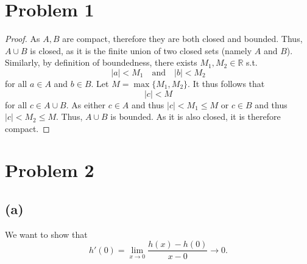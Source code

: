 \documentclass[10pt]{article}
\begin{document}
\section*{Problem 1}

\begin{proof}
    As $A,B$ are compact, therefore they are both closed and bounded. Thus, $A\cup B$ is closed, as it is the finite union of two closed sets (namely $A$ and $B$). Similarly, by definition of boundedness, there exists $M_1,M_2\in\mathbb{R}$ s.t.
    \[|a|<M_1 \quad\text{and}\quad|b|<M_2 \] 
    for all $a\in A$ and $b\in B.$ Let $M=\max\{M_1,M_2\}.$ It thus follows that
    \[|c|<M\]
    for all $c\in A\cup B.$ As either $c\in A$ and thus $|c|<M_1\le M$ or $c\in B$ and thus $|c|<M_2\le M.$  Thus, $A\cup B$ is bounded.
    As it is also closed, it is therefore compact.
\end{proof}

\section*{Problem 2}

\subsection*{(a)}

We want to show that
\begin{equation} \label{eq:funcl}
    h'(0)=\lim_{x\to 0} \frac{h(x)-h(0)}{x-0}\to 0.
\end{equation}
\end{document}
